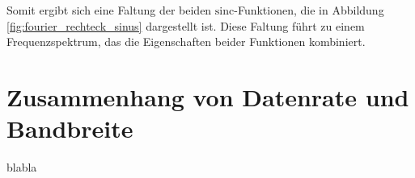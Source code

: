 Somit ergibt sich eine Faltung der beiden $\mathrm{sinc}$-Funktionen, die in Abbildung \ref{fig:fourier_rechteck_sinus} dargestellt ist. Diese Faltung führt zu einem Frequenzspektrum, das die Eigenschaften beider Funktionen kombiniert.

\section{Zusammenhang von Datenrate und Bandbreite}
blabla
\clearpage